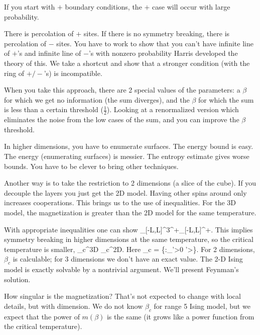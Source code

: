 If you start with $+$ boundary conditions, the $+$ case will occur with large probability.

There is percolation of $+$ sites. If there is no symmetry breaking, there is percolation of $-$ sites. You have to work to show that you can't have infinite line of $+$'s and infinite line of $-$'s with nonzero probability  %
Harris developed the theory of this. We take a shortcut and show that a stronger condition (with the ring of $+/-$'s) is incompatible.

When you take this approach, there are 2 special values of the parameters: a $\beta$ for which we get no information (the sum diverges), and the $\beta$ for which the sum is less than a certain threshold ($\frac{1}{2}$). Looking at a renormalized version which eliminates the noise from the low cases of the sum, and you can improve the $\beta$ threshold.

In higher dimensions, you have to enumerate surfaces. The energy bound is easy. The energy (enumerating surfaces) is messier. The entropy estimate gives worse bounds. You have to be clever to bring other techniques.

Another way is to take the restriction to 2 dimensions (a slice of the cube). If you decouple the layers you just get the 2D model. Having other spins around only increases cooperations. 
This brings us to the use of inequalities. For the 3D model, the magnetization is greater than the 2D model for the same temperature. 

With appropriate inequalities one can show
\be
\left{}\right\rangle_{[-L,L]^3}^+\ge \left{}\right\rangle_{[-L,L]}^+.
\ee
This implies symmetry breaking in higher dimensions at the same temperature, so the critical temperature is smaller,
\be
\beta_{c}^{3D} \le \beta_c^{2D}.
\ee
Here
\be
\beta_c = \inf \left\{{\beta}:{\left{}\right\rangle_{\beta'}>0 \forall \beta'>\beta}\right\}.
\ee
For 2 dimensions, $\beta_c$ is calculable; for 3 dimensions we don't have an exact value. The 2-D Ising model is exactly solvable by a nontrivial argument. We'll present Feynman's solution.

How singular is the magnetization? That's not expected to change with local details, but with dimension. We do not know $\beta_c$ for range 5 Ising model, but we expect that the power of $m(\beta)$ is the same (it grows like a power function from the critical temperature).